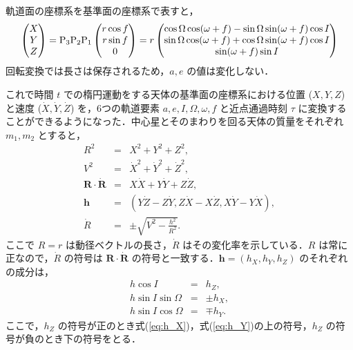 \documentclass[11pt,a4paper,oneside,onecolumn]{jreport}
\begin{document}
軌道面の座標系を基準面の座標系で表すと，
\begin{equation}
\begin{pmatrix}
X\\
Y\\
Z\\
\end{pmatrix}
= {\rm{\bm P}}_3 {\rm{\bm P}}_2 {\rm{\bm P}}_1
\begin{pmatrix}
r \cos f\\
r \sin f\\
0\\
\end{pmatrix}
= r 
\begin{pmatrix}
\cos \Omega \cos (\omega + f) - \sin \Omega \sin (\omega + f) \cos I\\
\sin \Omega \cos (\omega + f) + \cos \Omega \sin (\omega + f) \cos I\\
\sin (\omega + f) \sin I\\
\end{pmatrix}
\label{eq:xyzXYZ}
\end{equation}
回転変換では長さは保存されるため，$a, e$ の値は変化しない．

これで時間 $t$ での楕円運動をする天体の基準面の座標系における位置 ($X, Y, Z$) と速度 ($\dot{X}, \dot{Y}, \dot{Z}$) を，6つの軌道要素 $a, e, I, \Omega, \omega, f$ と近点通過時刻 $\tau$ に変換することができるようになった．中心星とそのまわりを回る天体の質量をそれぞれ $m_1, m_2$ とすると，
\begin{eqnarray}
R^2 & = & X^2 + Y^2 + Z^2, \label{eq:R}\\
V^2 & = & \dot{X}^2 + \dot{Y}^2 + \dot{Z}^2, \label{eq:Rdot}\\
{\bm R} \cdot \dot{{\bm R}} & = & X \dot{X} + Y \dot{Y} + Z \dot{Z}, \\
{\bm h} & = & (Y \dot{Z} - Z \dot{Y}, Z \dot{X} - X \dot{Z}, X \dot{Y} - Y \dot{X}), \\
\dot{R} & = & \pm \sqrt{V^2 - \frac{h^2}{R^2}}.
\end{eqnarray}
ここで $R = r$ は動径ベクトルの長さ，$\dot{R}$ はその変化率を示している．$R$ は常に正なので，$\dot{R}$ の符号は ${\bm R} \cdot \dot{{\bm R}}$ の符号と一致する．${\bm h} = (h_X, h_Y, h_Z)$ のそれぞれの成分は，
\begin{eqnarray}
h \cos I & = & h_Z, \label{eq:h_Z}\\
h \sin I \sin \Omega & = & \pm h_X, \label{eq:h_X}\\
h \sin I \cos \Omega & = & \mp h_Y. \label{eq:h_Y}
\end{eqnarray}
ここで，$h_Z$ の符号が正のとき式(\ref{eq:h_X})，式(\ref{eq:h_Y})の上の符号，$h_Z$ の符号が負のとき下の符号をとる．
\end{document}
